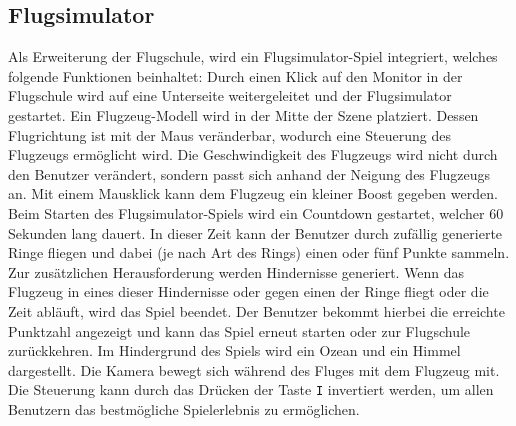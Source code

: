 \subsection{Flugsimulator}

Als Erweiterung der Flugschule, wird ein Flugsimulator-Spiel integriert, welches folgende Funktionen beinhaltet:
\newparagraph
Durch einen Klick auf den Monitor in der Flugschule wird auf eine Unterseite weitergeleitet und der Flugsimulator gestartet.
Ein Flugzeug-Modell wird in der Mitte der Szene platziert.
Dessen Flugrichtung ist mit der Maus veränderbar, wodurch eine Steuerung des Flugzeugs ermöglicht wird.
Die Geschwindigkeit des Flugzeugs wird nicht durch den Benutzer verändert, sondern passt sich anhand der Neigung des Flugzeugs an.
Mit einem Mausklick kann dem Flugzeug ein kleiner Boost gegeben werden.
\newparagraph
Beim Starten des Flugsimulator-Spiels wird ein Countdown gestartet, welcher 60 Sekunden lang dauert.
In dieser Zeit kann der Benutzer durch zufällig generierte Ringe fliegen und dabei (je nach Art des Rings) einen oder fünf Punkte sammeln.
Zur zusätzlichen Herausforderung werden Hindernisse generiert.
Wenn das Flugzeug in eines dieser Hindernisse oder gegen einen der Ringe fliegt oder die Zeit abläuft, wird das Spiel beendet.
Der Benutzer bekommt hierbei die erreichte Punktzahl angezeigt und kann das Spiel erneut starten oder zur Flugschule zurückkehren.
\newparagraph
Im Hindergrund des Spiels wird ein Ozean und ein Himmel dargestellt.
Die Kamera bewegt sich während des Fluges mit dem Flugzeug mit.
Die Steuerung kann durch das Drücken der Taste \texttt{I} invertiert werden, um allen Benutzern das bestmögliche Spielerlebnis zu ermöglichen.